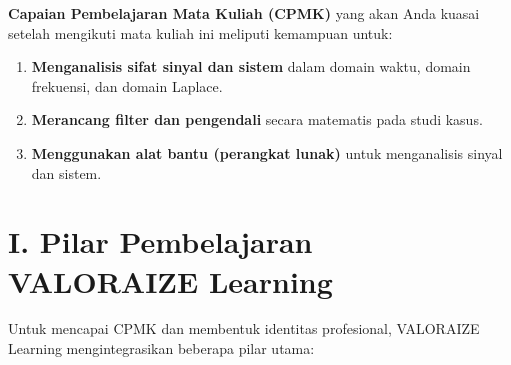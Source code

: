 \documentclass[
  letterpaper,
  DIV=11,
  numbers=noendperiod]{scrreprt}
\providecommand{\tightlist}{%
  \setlength{\itemsep}{0pt}\setlength{\parskip}{0pt}}
\begin{document}
\textbf{Capaian Pembelajaran Mata Kuliah (CPMK)} yang akan Anda kuasai
setelah mengikuti mata kuliah ini meliputi kemampuan untuk:

\begin{enumerate}
\def\labelenumi{\arabic{enumi}.}
\tightlist
\item
  \textbf{Menganalisis sifat sinyal dan sistem} dalam domain waktu,
  domain frekuensi, dan domain Laplace.
\item
  \textbf{Merancang filter dan pengendali} secara matematis pada studi
  kasus.
\item
  \textbf{Menggunakan alat bantu (perangkat lunak)} untuk menganalisis
  sinyal dan sistem.
\end{enumerate}

\section*{\texorpdfstring{\textbf{I. Pilar Pembelajaran VALORAIZE
Learning}}{I. Pilar Pembelajaran VALORAIZE Learning}}\label{i.-pilar-pembelajaran-valoraize-learning}


Untuk mencapai CPMK dan membentuk identitas profesional, VALORAIZE
Learning mengintegrasikan beberapa pilar utama:
\end{document}
